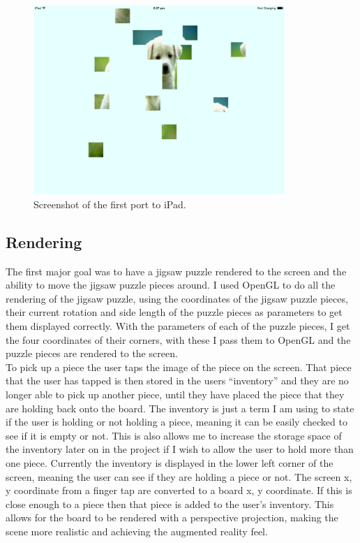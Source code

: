 \documentclass{article}
\begin{document}
\begin{figure}[ht]
\begin{center}
\includegraphics[width=0.85\textwidth]{images/iPadPortImage}
\caption{Screenshot of the first port to iPad.}
\label{fig:iPadPort}
\end{center}
\end{figure}

\subsection{Rendering}
The first major goal was to have a jigsaw puzzle rendered to the screen and the ability to move the jigsaw puzzle pieces around. I used OpenGL to do all the rendering of the jigsaw puzzle, using the coordinates of the jigsaw puzzle pieces, their current rotation and side length of the puzzle pieces as parameters to get them displayed correctly. With the parameters of each of the puzzle pieces, I get the four coordinates of their corners, with these I pass them to OpenGL and the puzzle pieces are rendered to the screen.\\
To pick up a piece the user taps the image of the piece on the screen. That piece that the user has tapped is then stored in the users “inventory” and they are no longer able to pick up another piece, until they have placed the piece that they are holding back onto the board. The inventory is just a term I am using to state if the user is holding or not holding a piece, meaning it can be easily checked to see if it is empty or not. This is also allows me to increase the storage space of the inventory later on in the project if I wish to allow the user to hold more than one piece. Currently the inventory is displayed in the lower left corner of the screen, meaning the user can see if they are holding a piece or not. The screen x, y coordinate from a finger tap are converted to a board x, y coordinate. If this is close enough to a piece then that piece is added to the user's inventory. This allows for the board to be rendered with a perspective projection, making the scene more realistic and achieving the augmented reality feel.
\end{document}
